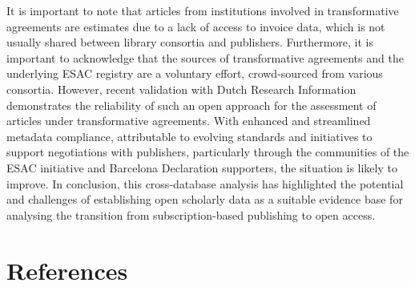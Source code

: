\documentclass[a4paper,man,floatsintext,longtable,noextraspace,10pt]{apa6}
\begin{document}
It is important to note that articles from institutions involved in
transformative agreements are estimates due to a lack of access to
invoice data, which is not usually shared between library consortia and
publishers. Furthermore, it is important to acknowledge that the sources
of transformative agreements and the underlying ESAC registry are a
voluntary effort, crowd-sourced from various consortia. However, recent
validation with Dutch Research Information demonstrates the reliability
of such an open approach for the assessment of articles under
transformative agreements. With enhanced and streamlined metadata
compliance, attributable to evolving standards and initiatives to
support negotiations with publishers, particularly through the
communities of the ESAC initiative and Barcelona Declaration supporters,
the situation is likely to improve. In conclusion, this cross-database
analysis has highlighted the potential and challenges of establishing
open scholarly data as a suitable evidence base for analysing the
transition from subscription-based publishing to open access.

\section{References}\label{references}
\end{document}
